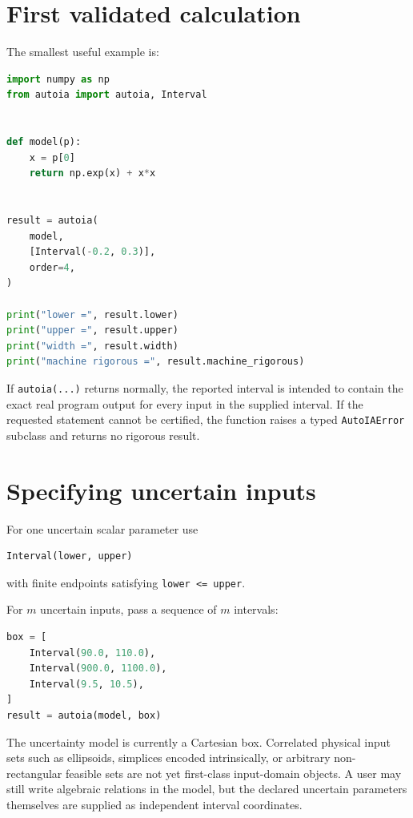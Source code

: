 \documentclass[11pt]{article}
\begin{document}
\section{First validated calculation}

The smallest useful example is:
\begin{lstlisting}[language=Python]
import numpy as np
from autoia import autoia, Interval


def model(p):
    x = p[0]
    return np.exp(x) + x*x


result = autoia(
    model,
    [Interval(-0.2, 0.3)],
    order=4,
)

print("lower =", result.lower)
print("upper =", result.upper)
print("width =", result.width)
print("machine rigorous =", result.machine_rigorous)
\end{lstlisting}

If \texttt{autoia(...)} returns normally, the reported interval is intended to
contain the exact real program output for every input in the supplied interval.
If the requested statement cannot be certified, the function raises a typed
\texttt{AutoIAError} subclass and returns no rigorous result.

\section{Specifying uncertain inputs}

For one uncertain scalar parameter use
\begin{lstlisting}[language=Python]
Interval(lower, upper)
\end{lstlisting}
with finite endpoints satisfying \texttt{lower <= upper}.

For \(m\) uncertain inputs, pass a sequence of \(m\) intervals:
\begin{lstlisting}[language=Python]
box = [
    Interval(90.0, 110.0),
    Interval(900.0, 1100.0),
    Interval(9.5, 10.5),
]
result = autoia(model, box)
\end{lstlisting}

The uncertainty model is currently a Cartesian box.  Correlated physical input
sets such as ellipsoids, simplices encoded intrinsically, or arbitrary
non-rectangular feasible sets are not yet first-class input-domain objects.  A
user may still write algebraic relations in the model, but the declared uncertain
parameters themselves are supplied as independent interval coordinates.
\end{document}
